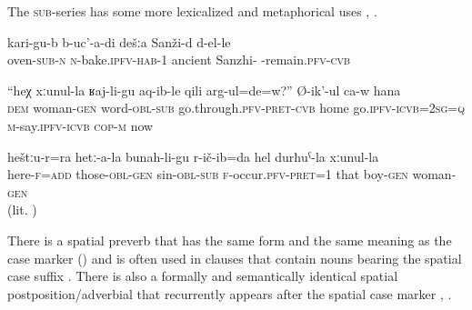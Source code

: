 The \textsc{sub}-series has some more lexicalized  and metaphorical uses , .
%
\begin{exe} 
	\ex	\label{In ancient times when we were in Sanzhi we baked (bread) in the community oven}
	\gll	kari-gu-b	b-uc'-a-di	dešːa	Sanži-d	d-el-le\\
		oven-\textsc{sub}-\textsc{n}	\textsc{n}-bake.\textsc{ipfv}-\textsc{hab}-1	ancient	Sanzhi-\tsc{1/2pl}	-remain.\textsc{pfv}-\textsc{cvb}\\
	\glt	{}
	
	\ex	\label{he says, You go home following the words of your wife, yes}
	\gll	``heχ	xːunul-la ʁaj-li-gu	aq-ib-le	qili	arg-ul=de=w?''	Ø-ik'-ul ca-w	hana \\
		\textsc{dem}	woman-\textsc{gen}	word-\textsc{obl}-\textsc{sub}	go.through.\textsc{pfv}-\textsc{pret}-\textsc{cvb}	home	go.\textsc{ipfv}-\textsc{icvb}=2\textsc{sg}=\textsc{q}	\textsc{m}-say.\textsc{ipfv}-\textsc{icvb} \textsc{cop-m}	now\\
	\glt	{}
	
	\ex	\label{Here also (i.e. in this case) I am guilty in front of my daughter-in-law}
	\gll	heštːu-r=ra	hetː-a-la	bunah-li-gu	r-ič-ib=da	hel	durħuˁ-la	xːunul-la \\
		here-\textsc{f}=\textsc{add}	those-\textsc{obl}-\textsc{gen}	sin-\textsc{obl}-\textsc{sub}	\textsc{f}-occur.\textsc{pfv}-\textsc{pret}=1	that	boy-\textsc{gen}	woman-\textsc{gen}\\
	\glt	{} (lit. )
\end{exe}

There is a spatial preverb that has the same form and the same meaning as the case marker () and is often used in clauses that contain nouns bearing the spatial case suffix . There is also a formally and semantically identical spatial postposition\slash adverbial that recurrently appears after the spatial case marker , .
	
